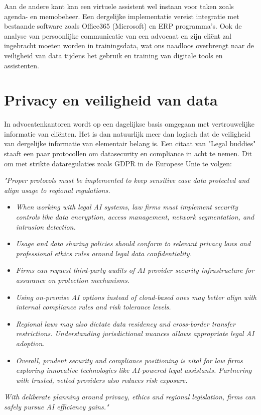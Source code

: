 Aan de andere kant kan een virtuele assistent wel instaan voor taken zoals agenda- en memobeheer.
Een dergelijke implementatie vereist integratie met bestaande software zoals Office365 (Microsoft) en ERP programma's.
Ook de analyse van persoonlijke communicatie van een advocaat en zijn cliënt zal ingebracht moeten worden in trainingsdata,
wat ons naadloos overbrengt naar de veiligheid van data tijdens het gebruik en training van digitale tools en assistenten.

\section{Privacy en veiligheid  van data}
In advocatenkantoren wordt op een dagelijkse basis omgegaan met vertrouwelijke informatie van cliënten.
Het is dan natuurlijk meer dan logisch dat de veiligheid van dergelijke informatie van elementair belang is.
Een citaat van "Legal buddies" staaft een paar protocollen om datasecurity en compliance in acht te nemen. 
Dit om met strikte dataregulaties zoals GDPR in de Europese Unie te volgen:

\begin{displayquote}
	\textit{"Proper protocols must be implemented to keep sensitive case data protected and align usage to regional regulations.}
	\begin{itemize}
		\item \emph{ When working with legal AI systems, law firms must implement security controls like data encryption, access management, network segmentation, and intrusion detection.}
		\item \emph{ Usage and data sharing policies should conform to relevant privacy laws and professional ethics rules around legal data confidentiality.}
		\item \emph{ Firms can request third-party audits of AI provider security infrastructure for assurance on protection mechanisms.}
		\item \emph{ Using on-premise AI options instead of cloud-based ones may better align with internal compliance rules and risk tolerance levels.}
		\item \emph{ Regional laws may also dictate data residency and cross-border transfer restrictions. Understanding jurisdictional nuances allows appropriate legal AI adoption.}
		\item \emph{ Overall, prudent security and compliance positioning is vital for law firms exploring innovative technologies like AI-powered legal assistants. Partnering with trusted, vetted providers also reduces risk exposure.}
	\end{itemize}

	\textit{With deliberate planning around privacy, ethics and regional legislation, firms can safely pursue AI efficiency gains."}\autocite{LegalBuddies}
\end{displayquote}

